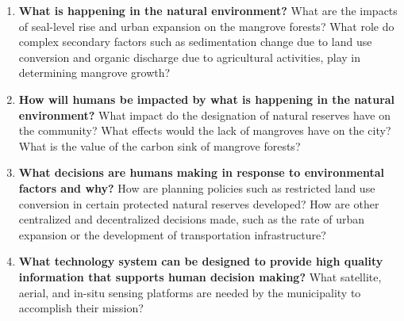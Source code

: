 \begin{enumerate}[itemsep=0pt,parsep=0pt]
	\item \textbf{What is happening in the natural environment?} What are the impacts of seal-level rise and urban expansion on the mangrove forests? What role do complex secondary factors such as sedimentation change due to land use conversion and organic discharge due to agricultural activities, play in determining mangrove growth? 
	\item \textbf{How will humans be impacted by what is happening in the natural environment?} What impact do the designation of natural reserves have on the community? What effects would the lack of mangroves have on the city? What is the value of the carbon sink of mangrove forests?
	\item \textbf{What decisions are humans making in response to environmental factors and why?} How are planning policies such as restricted land use conversion in certain protected natural reserves developed? How are other centralized and decentralized decisions made, such as the rate of urban expansion or the development of transportation infrastructure? 
	\item \textbf{What technology system can be designed to provide high quality information that supports human decision making?} What satellite, aerial, and in-situ sensing platforms are needed by the municipality to accomplish their mission?
\end{enumerate}

%

